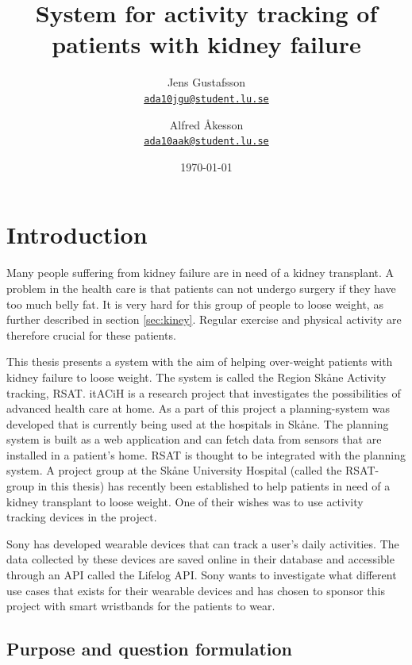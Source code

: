 \documentclass{cslthse-msc}
\author{
	Jens Gustafsson \\
	{\normalsize \href{mailto:ada10jgu@student.lu.se}{\texttt{ada10jgu@student.lu.se}}}
	\and
	Alfred Åkesson \\
    {\normalsize \href{mailto:ada10aak@student.lu.se}{\texttt{ada10aak@student.lu.se}}}
}
\title{System for activity tracking of patients with kidney failure}
\date{\today}
\begin{document}
\makefrontmatter


\chapter[Introduction]{Introduction}

Many people suffering from kidney failure are in need of a kidney transplant. A problem in the health care is that patients can not undergo surgery if they have too much belly fat. It is very hard for this group of people to loose weight, as further described in section \ref{sec:kiney}. Regular exercise and physical activity are therefore crucial for these patients. 

This thesis presents a system with the aim of helping over-weight patients with kidney failure to loose weight. The system is called the Region Skåne Activity tracking, RSAT. 
itACiH is a research project that investigates the possibilities of advanced health care at home. As a part of this project a planning-system was developed that is currently being used at the hospitals in Skåne. The planning system is built as a web application and can fetch data from sensors that are installed in a patient's home. RSAT is thought to be integrated with the planning system. 
A project group at the Skåne University Hospital (called the RSAT-group in this thesis) has recently been established to help patients in need of a kidney transplant to loose weight. One of their wishes was to use activity tracking devices in the project. 

Sony has developed wearable devices that can track a user’s daily activities. The data collected by these devices are saved online in their database and accessible through an API called the Lifelog API. Sony wants to investigate what different use cases that exists for their wearable devices and has chosen to sponsor this project with smart wristbands for the patients to wear.





\newpage

\section{Purpose and question formulation}
\end{document}
